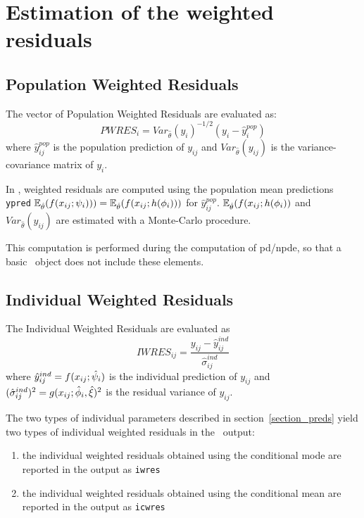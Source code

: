\section{Estimation of the weighted residuals} \label{section_wres}

\subsection{Population Weighted Residuals}
The vector of Population Weighted Residuals are evaluated as:
$$PWRES_{i} = Var_{\hat{\theta}}(y_{i})^{-1/2} \left( y_{i} - \hat{y}^{pop}_{i} \right)$$
where $\hat{y}^{pop}_{ij}$ is the population prediction of $y_{ij}$ and $Var_{\hat{\theta}}(y_{ij})$ is the variance-covariance matrix of $y_{i}$.

In \monolix, weighted residuals are computed using the population mean predictions \texttt{ypred} $\mathbb{E}_{\hat{\theta}}(f(x_{ij} ; {\psi_i}) ))=\mathbb{E}_{\hat{\theta}}(f(x_{ij} ; h({{\phi}_i}) ))$ for $\hat{y}^{pop}_{ij}$. $\mathbb{E}_{\hat{\theta}}(f(x_{ij} ; h({{\phi}_i})  )$ and $Var_{\hat{\theta}}(y_{ij})$ are estimated with a Monte-Carlo procedure.

 This computation is performed during the computation of pd/npde, so that a basic \monolix~object does not include these elements.


\subsection{Individual Weighted Residuals}

The Individual Weighted Residuals are evaluated as
$$IWRES_{ij} = \frac{y_{ij} - \hat{y}^{ind}_{ij}} {\hat{\sigma}^{ind}_{ij}}$$
where  $\hat{y}^{ind}_{ij} = f(x_{ij} ; \hat{\psi}_i )$ is the individual prediction of $y_{ij}$ and $(\hat{\sigma}^{ind}_{ij})^2 = g(x_{ij} ; \hat{{\phi}}_i,\hat{\xi})^2$ is the residual variance of $y_{ij}$.

The two types of individual parameters described in section~\ref{section_preds} yield two types of individual weighted residuals in the \monolix~output:
\begin{enumerate}
\item the individual weighted residuals obtained using the conditional mode are reported in the output as \texttt{iwres}
\item the individual weighted residuals obtained using the conditional mean are reported in the output as \texttt{icwres}
\end{enumerate}

